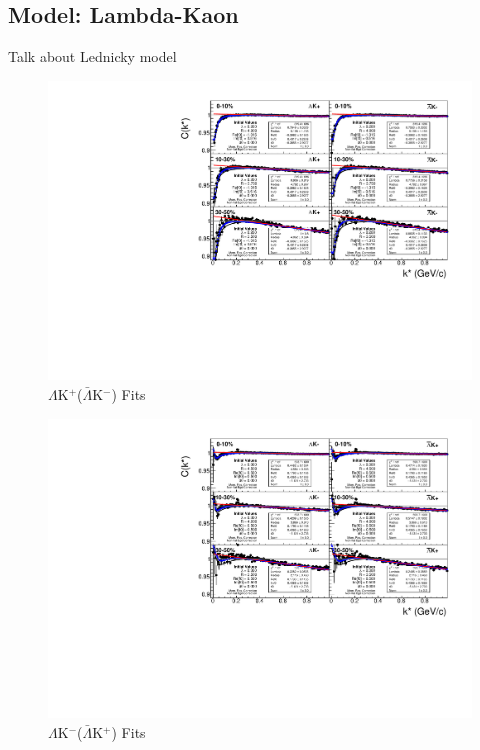 \documentclass[../AnalysisNoteJBuxton.tex]{subfiles}
\begin{document}
\subsection{Model: Lambda-Kaon}
\label{ModelLambdaKaon}

Talk about Lednicky model

\begin{figure}[h]
  \centering
  \includegraphics[width=\textwidth]{5_Fitting/Figures/canKStarCfwFitsLamKchPwConj_MomResCrctn_NonFlatBgdCrctn.pdf}
  \caption[$\Lambda$K$^{+}$($\bar{\Lambda}$K$^{-}$) Fits]{$\Lambda$K$^{+}$($\bar{\Lambda}$K$^{-}$) Fits}
  \label{fig:LamKchPwConjFits}
\end{figure}

\begin{figure}[h]
  \centering
  \includegraphics[width=\textwidth]{5_Fitting/Figures/canKStarCfwFitsLamKchMwConj_MomResCrctn_NonFlatBgdCrctn.pdf}
  \caption[$\Lambda$K$^{-}$($\bar{\Lambda}$K$^{+}$) Fits]{$\Lambda$K$^{-}$($\bar{\Lambda}$K$^{+}$) Fits}
  \label{fig:LamKchMwConjFits}
\end{figure}
\end{document}
